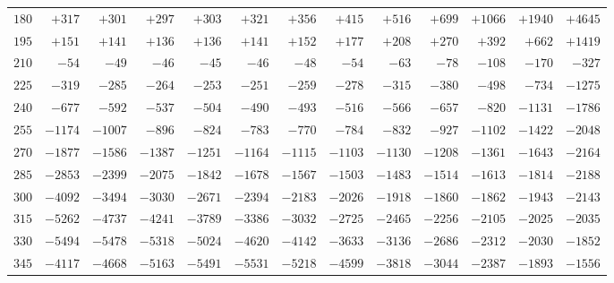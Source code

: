\begin{landscape}
\begin{center}
\begin{tabular}{@{}r|*{11}{r|}r@{}}
\(180\) & \(+317\) & \(+301\) & \(+297\) & \(+303\) & \(+321\) & \(+356\) & \(+415\) & \(+516\) & \(+699\) & \(+1066\) & \(+1940\) & \(+4645\)\\
\(195\) & \(+151\) & \(+141\) & \(+136\) & \(+136\) & \(+141\) & \(+152\) & \(+177\) & \(+208\) & \(+270\) & \(+392\) & \(+662\) & \(+1419\)\\
\(210\) & \(-54\) & \(-49\) & \(-46\) & \(-45\) & \(-46\) & \(-48\) & \(-54\) & \(-63\) & \(-78\) & \(-108\) & \(-170\) & \(-327\)\\
\(225\) & \(-319\) & \(-285\) & \(-264\) & \(-253\) & \(-251\) & \(-259\) & \(-278\) & \(-315\) & \(-380\) & \(-498\) & \(-734\) & \(-1275\)\\
\(240\) & \(-677\) & \(-592\) & \(-537\) & \(-504\) & \(-490\) & \(-493\) & \(-516\) & \(-566\) & \(-657\) & \(-820\) & \(-1131\) & \(-1786\)\\
\(255\) & \(-1174\) & \(-1007\) & \(-896\) & \(-824\) & \(-783\) & \(-770\) & \(-784\) & \(-832\) & \(-927\) & \(-1102\) & \(-1422\) & \(-2048\)\\
\(270\) & \(-1877\) & \(-1586\) & \(-1387\) & \(-1251\) & \(-1164\) & \(-1115\) & \(-1103\) & \(-1130\) & \(-1208\) & \(-1361\) & \(-1643\) & \(-2164\)\\
\(285\) & \(-2853\) & \(-2399\) & \(-2075\) & \(-1842\) & \(-1678\) & \(-1567\) & \(-1503\) & \(-1483\) & \(-1514\) & \(-1613\) & \(-1814\) & \(-2188\)\\
\(300\) & \(-4092\) & \(-3494\) & \(-3030\) & \(-2671\) & \(-2394\) & \(-2183\) & \(-2026\) & \(-1918\) & \(-1860\) & \(-1862\) & \(-1943\) & \(-2143\)\\
\(315\) & \(-5262\) & \(-4737\) & \(-4241\) & \(-3789\) & \(-3386\) & \(-3032\) & \(-2725\) & \(-2465\) & \(-2256\) & \(-2105\) & \(-2025\) & \(-2035\)\\
\(330\) & \(-5494\) & \(-5478\) & \(-5318\) & \(-5024\) & \(-4620\) & \(-4142\) & \(-3633\) & \(-3136\) & \(-2686\) & \(-2312\) & \(-2030\) & \(-1852\)\\
\(345\) & \(-4117\) & \(-4668\) & \(-5163\) & \(-5491\) & \(-5531\) & \(-5218\) & \(-4599\) & \(-3818\) & \(-3044\) & \(-2387\) & \(-1893\) & \(-1556\)\\
\end{tabular}
\end{center}
\endgroup
\end{landscape}
\clearpage
\endgroup
